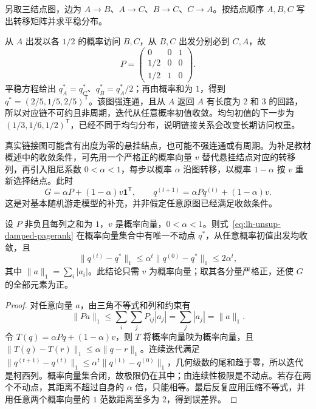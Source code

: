 \begin{example}
\label{ex:lh-unsup-pagerank}
另取三结点图，边为 $A\to B$、$A\to C$、$B\to C$、$C\to A$。按结点顺序 $A,B,C$ 写出转移矩阵并求平稳分布。
\end{example}
\begin{solve}
从 $A$ 出发以各 $1/2$ 的概率访问 $B,C$，从 $B,C$ 出发分别必到 $C,A$，故
\[
P=\begin{pmatrix}0&0&1\\1/2&0&0\\1/2&1&0\end{pmatrix}.
\]
平稳方程给出 $q_A^*=q_C^*$、$q_B^*=q_A^*/2$；再由概率和为 $1$，得到 $q^*=(2/5,1/5,2/5)^{\mathsf T}$。该图强连通，且从 $A$ 返回 $A$ 有长度为 $2$ 和 $3$ 的回路，所以对应链不可约且非周期，迭代从任意概率初值收敛。均匀初值的下一步为 $(1/3,1/6,1/2)^{\mathsf T}$，已经不同于均匀分布，说明链接关系会改变长期访问权重。
\end{solve}

真实链接图可能含有出度为零的悬挂结点，也可能不强连通或有周期。为补足教材概述中的收敛条件，可先用一个严格正的概率向量 $v$ 替代悬挂结点对应的转移列，再引入阻尼系数 $0<\alpha<1$，每步以概率 $\alpha$ 沿图转移，以概率 $1-\alpha$ 按 $v$ 重新选择结点。此时
\begin{equation}
G=\alpha P+(1-\alpha)v\mathbf1^{\mathsf T},\qquad
q^{(t+1)}=\alpha Pq^{(t)}+(1-\alpha)v.
\label{eq:lh-unsup-damped-pagerank}
\end{equation}
这是对基本随机游走模型的补充，并非假定任意原图已经满足收敛条件。

\begin{proposition}[阻尼迭代的唯一性与收敛性]
\label{prop:lh-unsup-pagerank-contraction}
设 $P$ 非负且每列之和为 $1$，$v$ 是概率向量，$0<\alpha<1$。则式~\eqref{eq:lh-unsup-damped-pagerank} 在概率向量集合中有唯一不动点 $q^*$，从任意概率初值出发均收敛，且
\begin{equation}
\|q^{(t)}-q^*\|_1\leq\alpha^t\|q^{(0)}-q^*\|_1
\leq2\alpha^t,
\label{eq:lh-unsup-pagerank-rate}
\end{equation}
其中 $\|a\|_1=\sum_i|a_i|$。此结论只需 $v$ 为概率向量；取其各分量严格正，还使 $G$ 的全部元素为正。
\end{proposition}
\begin{proof}
对任意向量 $a$，由三角不等式和列和约束有
\[
\|Pa\|_1\leq\sum_i\sum_jP_{ij}|a_j|
=\sum_j|a_j|=\|a\|_1.
\]
令 $T(q)=\alpha Pq+(1-\alpha)v$，则 $T$ 将概率向量映为概率向量，且 $\|T(q)-T(r)\|_1\leq\alpha\|q-r\|_1$。连续迭代满足 $\|q^{(t+1)}-q^{(t)}\|_1\leq\alpha^t\|q^{(1)}-q^{(0)}\|_1$，几何级数的尾和趋于零，所以迭代是柯西列。概率向量集合闭，故极限仍在其中；由连续性极限是不动点。若存在两个不动点，其距离不超过自身的 $\alpha$ 倍，只能相等。最后反复应用压缩不等式，并用任意两个概率向量的 $1$ 范数距离至多为 $2$，得到误差界。
\end{proof}

